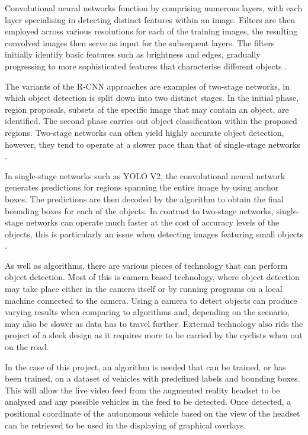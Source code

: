 \documentclass{l4proj}
\begin{document}
Convolutional neural networks function by comprising numerous layers, with each layer specialising in detecting distinct features within an image. Filters are then employed across various resolutions for each of the training images, the resulting convolved images then serve as input for the subsequent layers. The filters initially identify basic features such as brightness and edges, gradually progressing to more sophisticated features that characterise different objects \citep{od_definition}.

The variants of the R-CNN approaches are examples of two-stage networks, in which object detection is split down into two distinct stages. In the initial phase, region proposals, subsets of the specific image that may contain an object, are identified. The second phase carries out object classification within the proposed regions. Two-stage networks can often yield highly accurate object detection, however, they tend to operate at a slower pace than that of single-stage networks \citep{od_definition}.

In single-stage networks such as YOLO V2, the convolutional neural network generates predictions for regions spanning the entire image by using anchor boxes. The predictions are then decoded by the algorithm to obtain the final bounding boxes for each of the objects. In contrast to two-stage networks, single-stage networks can operate much faster at the cost of accuracy levels of the objects, this is particularly an issue when detecting images featuring small objects \citep{od_definition}.

As well as algorithms, there are various pieces of technology that can perform object detection. Most of this is camera based technology, where object detection may take place either in the camera itself or by running programs on a local machine connected to the camera. Using a camera to detect objects can produce varying results when comparing to algorithms and, depending on the scenario, may also be slower as data has to travel further. External technology also rids the project of a sleek design as it requires more to be carried by the cyclists when out on the road.

In the case of this project, an algorithm is needed that can be trained, or has been trained, on a dataset of vehicles with predefined labels and bounding boxes. This will allow the live video feed from the augmented reality headset to be analysed and any possible vehicles in the feed to be detected. Once detected, a positional coordinate of the autonomous vehicle based on the view of the headset can be retrieved to be used in the displaying of graphical overlays.
\end{document}

